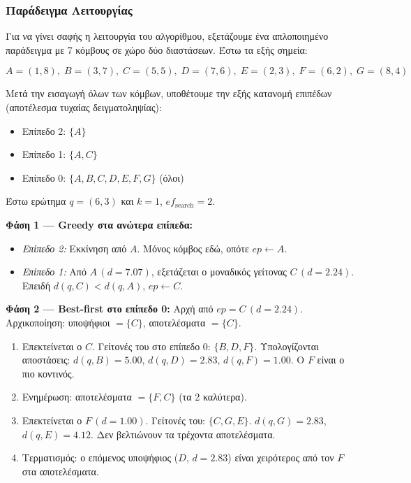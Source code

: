 \documentclass[12pt,a4paper]{article}
\begin{document}
\subsubsection{Παράδειγμα Λειτουργίας}
\label{sec:hnsw_example}

Για να γίνει σαφής η λειτουργία του αλγορίθμου, εξετάζουμε ένα απλοποιημένο παράδειγμα με 7 κόμβους σε χώρο δύο διαστάσεων. Έστω τα εξής σημεία:

\[
A=(1,8),\; B=(3,7),\; C=(5,5),\; D=(7,6),\; E=(2,3),\; F=(6,2),\; G=(8,4)
\]

Μετά την εισαγωγή όλων των κόμβων, υποθέτουμε την εξής κατανομή επιπέδων (αποτέλεσμα τυχαίας δειγματοληψίας):
\begin{itemize}
    \item Επίπεδο 2: $\{A\}$
    \item Επίπεδο 1: $\{A, C\}$
    \item Επίπεδο 0: $\{A, B, C, D, E, F, G\}$ (όλοι)
\end{itemize}

Έστω ερώτημα $q = (6, 3)$ και $k=1$, $ef_{\text{search}}=2$.

\textbf{Φάση 1 --- Greedy στα ανώτερα επίπεδα:}
\begin{itemize}
    \item \textit{Επίπεδο 2:} Εκκίνηση από $A$. Μόνος κόμβος εδώ, οπότε $ep \leftarrow A$.
    \item \textit{Επίπεδο 1:} Από $A\,(d=7.07)$, εξετάζεται ο μοναδικός γείτονας $C\,(d=2.24)$. Επειδή $d(q,C) < d(q,A)$, $ep \leftarrow C$.
\end{itemize}

\textbf{Φάση 2 --- Best-first στο επίπεδο 0:}
Αρχή από $ep = C\,(d=2.24)$. Αρχικοποίηση: υποψήφιοι $= \{C\}$, αποτελέσματα $= \{C\}$.
\begin{enumerate}
    \item Επεκτείνεται ο $C$. Γείτονές του στο επίπεδο 0: $\{B, D, F\}$. Υπολογίζονται αποστάσεις: $d(q,B)=5.00$, $d(q,D)=2.83$, $d(q,F)=1.00$. Ο $F$ είναι ο πιο κοντινός.
    \item Ενημέρωση: αποτελέσματα $= \{F, C\}$ (τα 2 καλύτερα).
    \item Επεκτείνεται ο $F\,(d=1.00)$. Γείτονές του: $\{C, G, E\}$. $d(q,G)=2.83$, $d(q,E)=4.12$. Δεν βελτιώνουν τα τρέχοντα αποτελέσματα.
    \item Τερματισμός: ο επόμενος υποψήφιος ($D$, $d=2.83$) είναι χειρότερος από τον $F$ στα αποτελέσματα.
\end{enumerate}
\end{document}
